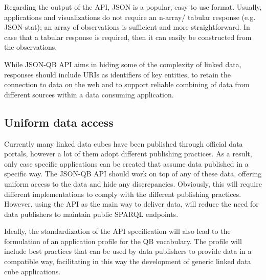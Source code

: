 \documentclass{llncs}
\begin{document}
Regarding the output of the API, JSON is a popular, easy to use format. Usually, applications and visualizations do not require an n-array/ tabular response (e.g. JSON-stat); an array of observations is sufficient and more straightforward. In case that a tabular response is required, then it can easily be constructed from the observations. 


While JSON-QB API aims in hiding some of the complexity of linked data, responses should include URIs as identifiers of key entities, to retain the connection to data on the web and to support reliable combining of data from different sources within a data consuming application.

\subsection{Uniform data access}

Currently many linked data cubes have been published through official data portals, however a lot of them adopt different publishing practices. As a result, only case specific applications can be created that assume data published in a specific way. The JSON-QB API should work on top of any of these data, offering uniform access to the data and hide any discrepancies. Obviously, this will require different implementations to comply with the different publishing practices. However, using the API as the main way to deliver data, will reduce the need for data publishers to maintain public SPARQL endpoints.

Ideally, the standardization of the API specification will also lead to the formulation of an application profile for the QB vocabulary. The profile will include best practices that can be used by data publishers to provide data in a compatible way, facilitating in this way the development of generic linked data cube applications.
\end{document}
